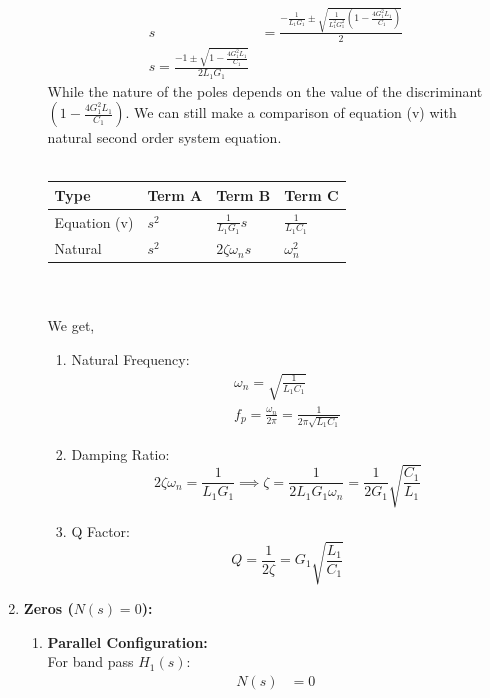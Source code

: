 \begin{enumerate}
\begin{enumerate}
\begin{align*}
          s &= \frac{-\frac{1}{L_1 G_1} \pm \sqrt{\frac{1}{L_1^2 G_1^2} \left(1 - \frac{4 G_1^2 L_1}{C_1}\right)}}{2} \\
          s = \frac{-1 \pm \sqrt{1 - \frac{4 G_1^2 L_1}{C_1}}}{2 L_1 G_1}
        \end{align*}
        While the nature of the poles depends on the value of the
        discriminant \(\left(1 - \frac{4 G_1^2 L_1}{C_1}\right)\).
        We can still make a comparison of equation (v) with natural
        second order system equation.\\ \\
        \begin{tabularx}{\linewidth}{|X|X|X|X|} \hline
          Type & Term A & Term B & Term C \\ \hline
          Equation (v) & \(s^2\) & \(\frac{1}{L_1 G_1} s\) & \(\frac{1}{L_1 C_1}\) \\ \hline
          Natural & \(s^2\) & \(2 \zeta \omega_n s\) & \(\omega_n^2\) \\ \hline
        \end{tabularx}\\ \\
        We get,
        \begin{enumerate}
          \item Natural Frequency:
            \begin{align*}
              \omega_n = \sqrt{\frac{1}{L_1 C_1}} \\
              f_p = \frac{\omega_n}{2\pi} = \frac{1}{2\pi \sqrt{L_1 C_1}}
            \end{align*}
          \item Damping Ratio:
            \[
              2 \zeta \omega_n = \frac{1}{L_1 G_1} \implies \zeta = \frac{1}{2 L_1 G_1 \omega_n} = \frac{1}{2 G_1} \sqrt{\frac{C_1}{L_1}}
            \]
          \item Q Factor:
            \[
              Q = \frac{1}{2\zeta} = G_1 \sqrt{\frac{L_1}{C_1}}
            \]
        \end{enumerate}
    \end{enumerate}
  \item \textbf{Zeros (\(N(s) = 0\)):} \\
    \begin{enumerate}
      \item \textbf{Parallel Configuration:}\\
        For band pass \(H_1(s)\):
          \begin{align*}
            N(s) &= 0 \\

\end{align*}
\end{enumerate}
\end{enumerate}
